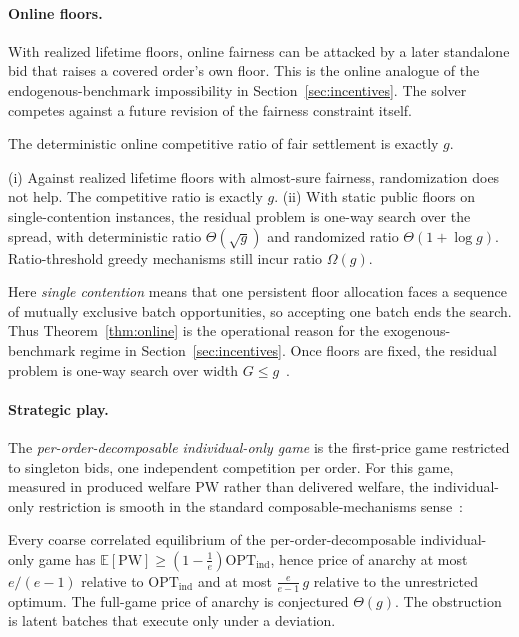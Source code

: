 \documentclass{llncs}
\newcommand{\OPT}{\mathrm{OPT}}
\newcommand{\PW}{\mathrm{PW}}
\newcommand{\E}{\mathbb{E}}
\begin{document}
\paragraph{Online floors.}
With realized lifetime floors, online fairness can be attacked by a later
standalone bid that raises a covered order's own floor. This is the
online analogue of the endogenous-benchmark impossibility in
Section~\ref{sec:incentives}. The solver competes against a future
revision of the fairness constraint itself.
\begin{proposition}\label{prop:online}
The deterministic online competitive ratio of fair settlement is exactly
$g$.
\end{proposition}
\begin{theorem}\label{thm:online}
(i) Against realized lifetime floors with almost-sure fairness,
randomization does not help. The competitive ratio is exactly $g$. (ii)
With static public floors on single-contention instances, the residual
problem is one-way search over the spread, with deterministic ratio
$\Theta(\sqrt g)$ and randomized ratio $\Theta(1+\log g)$. Ratio-threshold
greedy mechanisms still incur ratio $\Omega(g)$.
\end{theorem}
Here \emph{single contention} means that one persistent floor allocation
faces a sequence of mutually exclusive batch opportunities, so accepting
one batch ends the search.
Thus Theorem~\ref{thm:online} is the operational reason for the
exogenous-benchmark regime in Section~\ref{sec:incentives}. Once floors
are fixed, the residual problem is one-way search over width
$G\le g$~\cite{elyaniv2001}.

\paragraph{Strategic play.}
The \emph{per-order-decomposable individual-only game} is the first-price
game restricted to singleton bids, one independent competition per order.
For this game, measured in produced welfare $\PW$ rather than
delivered welfare, the individual-only restriction is smooth in the
standard composable-mechanisms sense~\cite{roughgarden2015,syrgkanis2013}:
\begin{theorem}\label{thm:poa}
Every coarse correlated equilibrium of the per-order-decomposable
individual-only game has
$\E[\PW]\ge(1-\tfrac1e)\OPT_{\mathrm{ind}}$, hence price of anarchy at
most $e/(e-1)$ relative to $\OPT_{\mathrm{ind}}$ and at most
$\frac{e}{e-1}\,g$ relative to the unrestricted optimum. The full-game
price of anarchy is conjectured $\Theta(g)$. The obstruction is latent
batches that execute only under a deviation.
\end{theorem}
\end{document}
